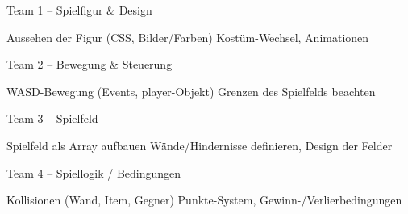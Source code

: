 Team 1 – Spielfigur & Design 

Aussehen der Figur (CSS, Bilder/Farben)
Kostüm-Wechsel, Animationen

Team 2 – Bewegung & Steuerung 

WASD-Bewegung (Events, player-Objekt)
Grenzen des Spielfelds beachten

Team 3 – Spielfeld

Spielfeld als Array aufbauen
Wände/Hindernisse definieren, Design der Felder

Team 4 – Spiellogik / Bedingungen 

Kollisionen (Wand, Item, Gegner)
Punkte-System, Gewinn-/Verlierbedingungen
